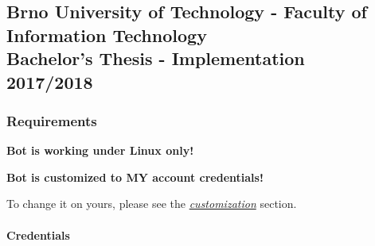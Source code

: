 \subsection{\texorpdfstring{Brno University of Technology - Faculty of
Information Technology\\
Bachelor's Thesis - Implementation\\
2017/2018}{Brno University of Technology - Faculty of Information Technology Bachelor's Thesis - Implementation 2017/2018}}\label{brno-university-of-technology---faculty-of-information-technology-bachelors-thesis---implementation-20172018}

\subsubsection{Requirements}\label{requirements}

\textbf{Bot is working under Linux only!}

\textbf{Bot is customized to MY account credentials!}

To change it on yours, please see the
\href{https://github.com/europ/VUTBR-FIT-BT-IMPL\#customization}{\emph{customization}}
section.

\paragraph{Credentials}\label{credentials}

